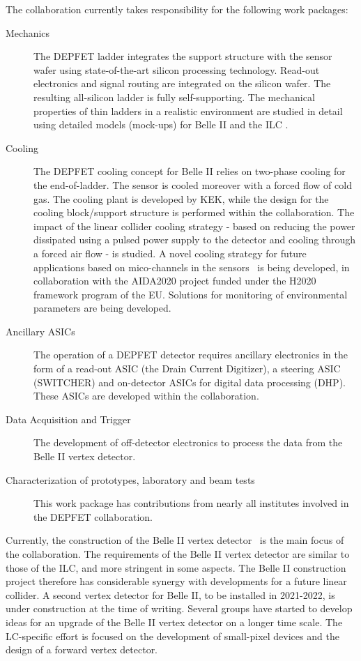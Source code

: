 The collaboration currently takes responsibility for the following work packages:
\begin{description}
\item[Mechanics] {The DEPFET ladder integrates the support structure with the sensor wafer using state-of-the-art silicon processing technology. Read-out electronics and signal routing are integrated on the silicon wafer. The resulting all-silicon ladder is fully self-supporting. The mechanical properties of thin ladders in a realistic environment are studied in detail using detailed models (mock-ups) for Belle II and the ILC .}
\item[Cooling] {The DEPFET cooling concept for Belle II relies on two-phase  cooling for the end-of-ladder. The sensor is cooled moreover with a forced flow of cold gas. The  cooling plant is developed by KEK, while the design for the cooling block/support structure is performed within the collaboration. The impact of the linear collider cooling strategy - based on reducing the power dissipated using a pulsed power supply to the detector and cooling through a forced air flow - is studied. A novel cooling strategy for future applications based on mico-channels in the sensors~\cite{Vos:2017uin,Andricek:2016rsq} is being developed, in collaboration with the AIDA2020 project funded under the H2020 framework program of the EU. Solutions for monitoring of environmental parameters are being developed.}
\item[Ancillary ASICs] {The operation of a DEPFET detector requires ancillary electronics in the form of a read-out ASIC (the Drain Current Digitizer), a steering ASIC (SWITCHER) and on-detector ASICs for digital data processing (DHP). These ASICs are developed within the collaboration.}
\item[Data Acquisition and Trigger] {The development of off-detector electronics to process the data from the Belle II vertex detector.}
\item[Characterization of prototypes, laboratory and beam tests] {This work package has contributions from nearly all institutes involved in the DEPFET collaboration.}
\end{description}

Currently, the construction of the Belle II vertex detector~\cite{Abe:2010gxa} is the main focus of the collaboration. The requirements of the Belle II vertex detector are similar to those of the ILC, and more stringent in some aspects. The Belle II construction project therefore has considerable synergy with developments for a future linear collider. A second vertex detector for Belle II, to be installed in 2021-2022, is under construction at the time of writing. Several groups have started to develop ideas for an upgrade of the Belle II vertex detector on a longer time scale. The LC-specific effort is focused on the development of small-pixel devices and the design of a forward vertex detector. 

